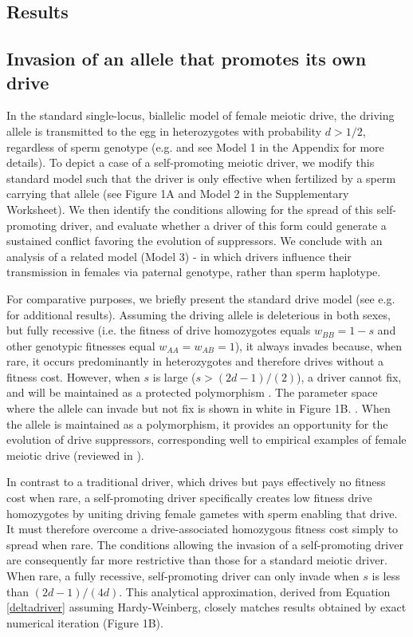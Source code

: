 \documentclass{pnastwo}
\begin{document}
\begin{article}
\section{Results}
\subsection{Invasion of an allele that promotes its own drive}
In the standard single-locus, biallelic model of female meiotic drive,
the driving allele is transmitted to the egg in heterozygotes with
probability  $d > 1/2$, regardless of sperm genotype (e.g. \cite{Ubeda2004} and see Model 1 in the Appendix for more details). 
To depict a case of a self-promoting meiotic driver,  we modify this standard model such 
	that the driver is only effective when fertilized by a sperm carrying that allele (see Figure 1A and Model 2 	in the Supplementary Worksheet). 
We then identify the conditions allowing for the spread of this self-promoting driver, 
	and evaluate whether a driver of this form could generate a sustained conflict favoring the evolution of suppressors. 
We conclude with an analysis of a related model (Model 3) - in which
drivers influence their transmission in females via paternal genotype,
rather than sperm haplotype. 

For comparative purposes, we briefly present the standard drive model 
	(see e.g. \cite{Prout1973,Ubeda2004} for additional results). 
Assuming the driving allele is deleterious in both sexes, but fully recessive 
	(i.e. the fitness of drive homozygotes equals $w_{BB}=1-s$ and other genotypic fitnesses equal $w_{AA}=w_{AB}=1$), 
	it always invades because, when rare, it occurs predominantly in heterozygotes and therefore drives without a fitness cost. 
However, when $s$ is large ($s>(2d-1)/(2)$), a driver cannot fix, and
will be maintained as a protected polymorphism \cite{Prout1973}. 
The parameter space where the allele can invade but not fix is shown in white
        in Figure 1B. . 
When the allele is maintained as a polymorphism, it provides an opportunity for the evolution of
	drive suppressors, corresponding well to empirical examples of
        female meiotic drive (reviewed in \cite{Burt2006}). 

In contrast to a traditional driver, which drives but pays effectively
	no fitness cost when rare, 
a self-promoting driver specifically creates low fitness drive homozygotes 
	by uniting driving female gametes with sperm enabling that drive.
It must therefore overcome a drive-associated homozygous fitness cost simply to spread when rare. 
The conditions allowing the invasion of a self-promoting driver
 	are consequently far more restrictive than those for a standard meiotic driver.
When rare, a fully recessive, self-promoting driver can only invade when $s$ 
	is less than $(2 d - 1)/(4 d)$. 
This analytical approximation, derived from Equation \eqref{deltadriver} assuming Hardy-Weinberg, 
	closely matches results obtained by exact numerical iteration (Figure 1B). 




\end{article}
\end{document}
